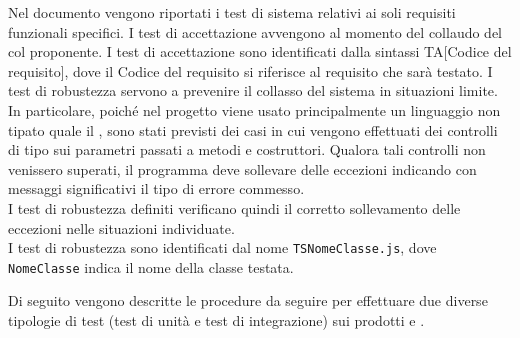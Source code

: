 				Nel documento  vengono riportati i test di sistema relativi ai soli requisiti funzionali specifici.
				I test di accettazione avvengono al momento del collaudo del  col proponente.
				I test di accettazione sono identificati dalla sintassi TA[Codice del requisito], dove il Codice del requisito si riferisce al requisito che sarà testato.
				I test di robustezza servono a prevenire il collasso del sistema in situazioni limite. In particolare, poiché nel progetto viene usato principalmente un linguaggio non tipato quale il , sono stati previsti dei casi in cui vengono effettuati dei controlli di tipo sui parametri passati a metodi e costruttori. Qualora tali controlli non venissero superati, il programma deve sollevare delle eccezioni indicando con messaggi significativi il tipo di errore commesso.\\
				I test di robustezza definiti verificano quindi il corretto sollevamento delle eccezioni nelle situazioni individuate.\\
				I test di robustezza sono identificati dal nome \texttt{TSNomeClasse.js}, dove \texttt{NomeClasse} indica il nome della classe testata.
				
			 \label{sec:procedure}
			Di seguito vengono descritte le procedure da seguire per effettuare due diverse tipologie di test (test di unità e test di integrazione) sui prodotti \textit{} e \textit{}.
			
